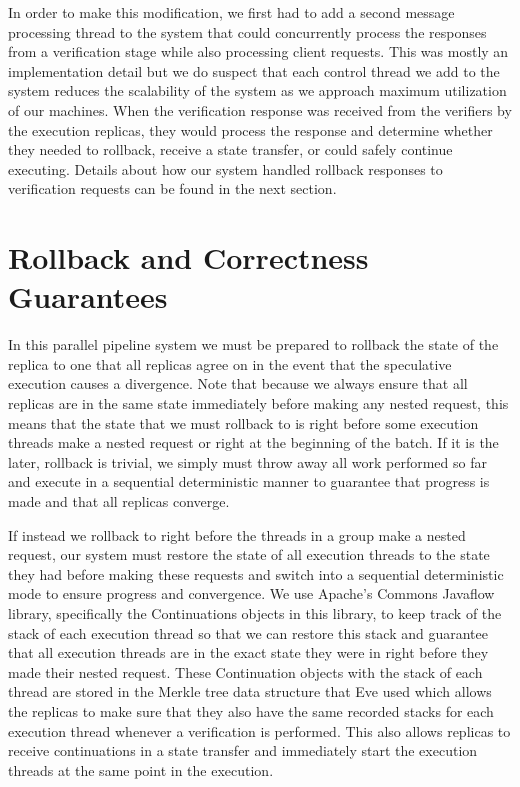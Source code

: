 \documentclass[11pt, oneside]{report}
\begin{document}
In order to make this modification, we first had to add a second message processing thread to the system that could concurrently process the responses from a verification stage while also processing client requests. 
This was mostly an implementation detail but we do suspect that each control thread we add to the system reduces the scalability of the system as we approach maximum utilization of our machines. 
When the verification response was received from the verifiers by the execution replicas, they would process the response and determine whether they needed to rollback, receive a state transfer, or could safely continue executing. 
Details about how our system handled rollback responses to verification requests can be found in the next section.

\section{Rollback and Correctness Guarantees}

In this parallel pipeline system we must be prepared to rollback the state of the replica to one that all replicas agree on in the event that the speculative execution causes a divergence. 
Note that because we always ensure that all replicas are in the same state immediately before making any nested request, this means that the state that we must rollback to is right before some execution threads make a nested request or right at the beginning of the batch. 
If it is the later, rollback is trivial, we simply must throw away all work performed so far and execute in a sequential deterministic manner to guarantee that progress is made and that all replicas converge.

If instead we rollback to right before the threads in a group make a nested request, our system must restore the state of all execution threads to the state they had before making these requests and switch into a sequential deterministic mode to ensure progress and convergence. 
We use Apache's Commons Javaflow library, specifically the Continuations objects in this library, to keep track of the stack of each execution thread so that we can restore this stack and guarantee that all execution threads are in the exact state they were in right before they made their nested request. 
These Continuation objects with the stack of each thread are stored in the Merkle tree data structure that Eve used which allows the replicas to make sure that they also have the same recorded stacks for each execution thread whenever a verification is performed. 
This also allows replicas to receive continuations in a state transfer and immediately start the execution threads at the same point in the execution. 
\end{document}
